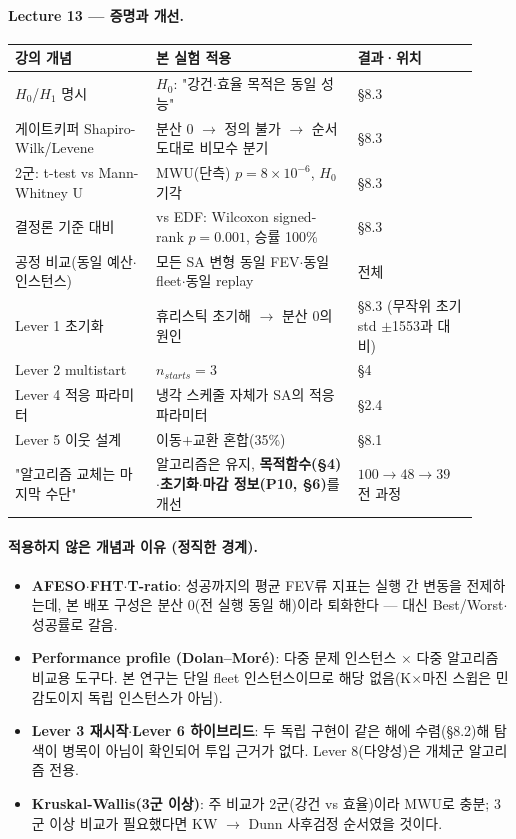 \documentclass[11pt]{article}
\begin{document}
\paragraph{Lecture 13 — 증명과 개선.}
\begin{table}[H]\centering\small
\begin{tabular}{p{0.28\linewidth}p{0.40\linewidth}p{0.24\linewidth}}
\toprule
강의 개념 & 본 실험 적용 & 결과·위치 \\
\midrule
$H_0$/$H_1$ 명시 & $H_0$: "강건$\cdot$효율 목적은 동일 성능" & \S8.3 \\
게이트키퍼 Shapiro-Wilk/Levene & 분산 0 $\to$ 정의 불가 $\to$ 순서도대로 비모수 분기 & \S8.3 \\
2군: t-test vs Mann-Whitney U & MWU(단측) $p{=}8{\times}10^{-6}$, $H_0$ 기각 & \S8.3 \\
결정론 기준 대비 & vs EDF: Wilcoxon signed-rank $p{=}0.001$, 승률 100\% & \S8.3 \\
공정 비교(동일 예산$\cdot$인스턴스) & 모든 SA 변형 동일 FEV$\cdot$동일 fleet$\cdot$동일 replay & 전체 \\
Lever 1 초기화 & 휴리스틱 초기해 $\to$ 분산 0의 원인 & \S8.3 (무작위 초기 std $\pm$1553과 대비) \\
Lever 2 multistart & $n_{starts}{=}3$ & \S4 \\
Lever 4 적응 파라미터 & 냉각 스케줄 자체가 SA의 적응 파라미터 & \S2.4 \\
Lever 5 이웃 설계 & 이동$+$교환 혼합(35\%) & \S8.1 \\
"알고리즘 교체는 마지막 수단" & 알고리즘은 유지, \textbf{목적함수(\S4)$\cdot$초기화$\cdot$마감 정보(P10, \S6)}를 개선 & $100\to48\to39$ 전 과정 \\
\bottomrule
\end{tabular}
\end{table}

\paragraph{적용하지 않은 개념과 이유 (정직한 경계).}
\begin{itemize}[nosep]
  \item \textbf{AFESO$\cdot$FHT$\cdot$T-ratio}: 성공까지의 평균 FEV류 지표는 실행 간 변동을 전제하는데,
        본 배포 구성은 분산 0(전 실행 동일 해)이라 퇴화한다 — 대신 Best/Worst$\cdot$성공률로 갈음.
  \item \textbf{Performance profile (Dolan--Mor\'e)}: 다중 문제 인스턴스 $\times$ 다중 알고리즘 비교용 도구다.
        본 연구는 단일 fleet 인스턴스이므로 해당 없음(K$\times$마진 스윕은 민감도이지 독립 인스턴스가 아님).
  \item \textbf{Lever 3 재시작$\cdot$Lever 6 하이브리드}: 두 독립 구현이 같은 해에 수렴(\S8.2)해
        탐색이 병목이 아님이 확인되어 투입 근거가 없다. Lever 8(다양성)은 개체군 알고리즘 전용.
  \item \textbf{Kruskal-Wallis(3군 이상)}: 주 비교가 2군(강건 vs 효율)이라 MWU로 충분;
        3군 이상 비교가 필요했다면 KW $\to$ Dunn 사후검정 순서였을 것이다.
\end{itemize}
\end{document}
